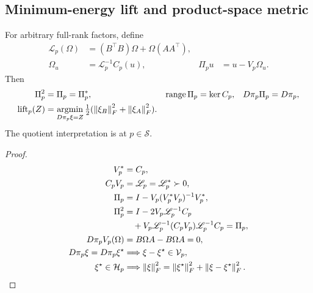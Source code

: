 \subsection{Minimum-energy lift and product-space metric}
\begin{proposition}
\label{prop:minimum-lift}
For arbitrary full-rank factors, define
\begin{align}
\mathscr L_p(\Omega)&=(B^\top B)\Omega+\Omega(AA^\top),\\
\Omega_u&=\mathscr L_p^{-1}C_p(u),&
\Pi_pu&=u-V_p\Omega_u .
\end{align}
Then
\begin{align}
\Pi_p^2&=\Pi_p=\Pi_p^*,&
\operatorname{range}\Pi_p&=\ker C_p,&D\pi_p\Pi_p&=D\pi_p,\\
{\rm lift}_p(Z)&=\mathop{\rm argmin}_{D\pi_p\xi=Z}
\tfrac12(\left\lVert\xi_B\right\rVert_F^2+\left\lVert\xi_A\right\rVert_F^2).
\label{eq:rigid-lift-min}
\end{align}
The quotient interpretation is at $p\in\mathcal S$.
\end{proposition}
\begin{proof}
\begin{align}
V_p^*&=C_p,\\
C_pV_p&=\mathscr L_p=\mathscr L_p^*\succ0,\\
\Pi_p&=I-V_p(V_p^*V_p)^{-1}V_p^*,\\
\Pi_p^2&=I-2V_p\mathscr L_p^{-1}C_p\notag\\
&\quad+V_p\mathscr L_p^{-1}(C_pV_p)\mathscr L_p^{-1}C_p
=\Pi_p,\\
D\pi_pV_p(\Omega)&=B\Omega A-B\Omega A=0,\\
D\pi_p\xi=D\pi_p\xi^\star
&\Longrightarrow\xi-\xi^\star\in\mathcal V_p,\\
\xi^\star\in\mathcal H_p&\Longrightarrow
\left\lVert\xi\right\rVert_F^2=\left\lVert\xi^\star\right\rVert_F^2+\left\lVert\xi-\xi^\star\right\rVert_F^2.
\end{align}
\end{proof}

